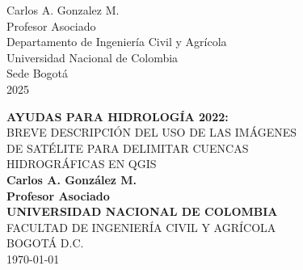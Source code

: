 \documentclass[12pt,hidelinks]{article}
\begin{document}
\begin{titlepage}
		\vspace{\baselineskip} %
    \vspace*{2\baselineskip}
	{\huge  Carlos A. Gonzalez M. \\
	
	\large Profesor Asociado \\
	Departamento de Ingeniería Civil y Agrícola\\
	Universidad Nacional de Colombia\\  
		Sede Bogotá\\
	2025	} 
		\\
\end{titlepage}



\begin{titlepage}
    \thispagestyle{empty}
    \begin{center}
    
    

    
        \textbf{AYUDAS PARA HIDROLOGÍA
2022: }\\[1.0in]
BREVE DESCRIPCIÓN DEL USO DE LAS IMÁGENES\\ DE
SATÉLITE PARA DELIMITAR CUENCAS\\ HIDROGRÁFICAS
EN QGIS\\[1.0in]
 \textbf{Carlos A. González M.}\\
\textbf{Profesor Asociado}  \\[1.0in]
   \textbf{UNIVERSIDAD NACIONAL DE COLOMBIA}\\
   FACULTAD DE INGENIERÍA CIVIL Y AGRÍCOLA\\
   BOGOTÁ D.C.\\
   \today
    \end{center}
\end{titlepage}
\end{document}
